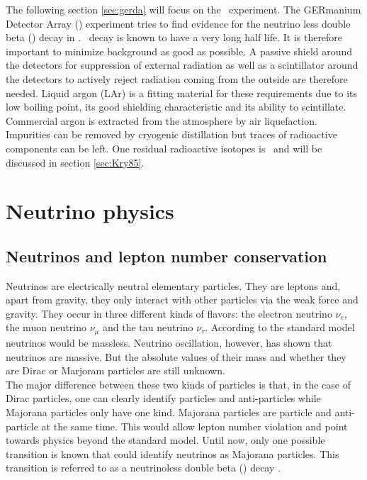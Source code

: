 \documentclass[encoding=utf8,british]{tumphthesis}
\begin{document}
The following section \ref{sec:gerda} will focus on the \gerda\ experiment.
The GERmanium Detector Array (\gerda) experiment tries to find evidence for the neutrino less double beta (\onbb) decay in .
\onbb\ decay is known to have a very long half life.
It is therefore important to minimize background as good as possible. 
A passive shield around the detectors for suppression of external radiation as well as a scintillator around the detectors to actively reject radiation coming from the outside are therefore needed.
Liquid argon (LAr) is a fitting material for these requirements due to its low boiling point, its good shielding characteristic and its ability to scintillate. 
Commercial argon is extracted from the atmosphere by air liquefaction. 
Impurities can be removed by cryogenic distillation but traces of radioactive components can be left.
One residual radioactive isotopes is \Kr\ and  will be discussed in section \ref{sec:Kry85}. 
\\


\section{Neutrino physics}
\label{sec:PhyBG}

\subsection{Neutrinos and lepton number conservation}

Neutrinos are electrically neutral elementary particles.
They are leptons and, apart from gravity, they only interact with other particles via the weak force and gravity.
They occur in three different kinds of flavors: the electron neutrino $\nu_e$, the muon neutrino $\nu_{\mu}$ and the tau neutrino $\nu_{\tau}$.
According to the standard model neutrinos would be massless.
Neutrino oscillation, however, has shown that neutrinos are massive.
But the absolute values of their mass and whether they are Dirac or Marjoram particles are still unknown.
\\

The major difference between these two kinds of particles is that, in the case of Dirac particles, one can clearly identify particles and anti-particles while Majorana particles only have one kind.
Majorana particles are particle and anti-particle at the same time.
This would allow lepton number violation and point towards physics beyond the standard model.
Until now, only one possible transition is known that could identify neutrinos as Majorana particles.
This transition is referred to as a neutrinoless double beta (\onbb) decay \cite{noauthor_phys._nodate-1}.
 
\end{document}
